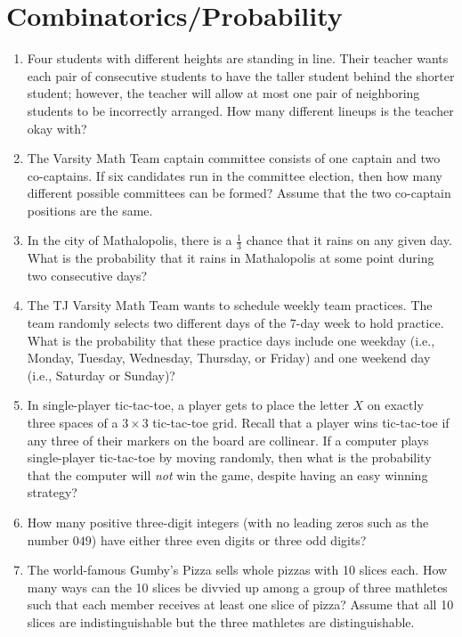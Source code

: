 \documentclass[11pt]{article}
\begin{document}
	\section{Combinatorics/Probability}
		\begin{enumerate}[1.]
			\item Four students with different heights are standing in line. Their teacher wants each pair of consecutive students to have the taller student behind the shorter student; however, the teacher will allow at most one pair of neighboring students to be incorrectly arranged. How many different lineups is the teacher okay with?
			
			\item The Varsity Math Team captain committee consists of one captain and two co-captains. If six candidates run in the committee election, then how many different possible committees can be formed? Assume that the two co-captain positions are the same.
			
			\item In the city of Mathalopolis, there is a $\frac{1}{3}$ chance that it rains on any given day. What is the probability that it rains in Mathalopolis at some point during two consecutive days?
			
			\item The TJ Varsity Math Team wants to schedule weekly team practices. The team randomly selects two different days of the 7-day week to hold practice. What is the probability that these practice days include one weekday (i.e., Monday, Tuesday, Wednesday, Thursday, or Friday) and one weekend day (i.e., Saturday or Sunday)?
			
			\item In single-player tic-tac-toe, a player gets to place the letter $X$ on exactly three spaces of a $3 \times 3$ tic-tac-toe grid. Recall that a player wins tic-tac-toe if any three of their markers on the board are collinear. If a computer plays single-player tic-tac-toe by moving randomly, then what is the probability that the computer will \textit{not} win the game, despite having an easy winning strategy?
			
			\item How many positive three-digit integers (with no leading zeros such as the number $049$) have either three even digits or three odd digits?
			
			\item The world-famous Gumby's Pizza sells whole pizzas with 10 slices each. How many ways can the 10 slices be divvied up among a group of three mathletes such that each member receives at least one slice of pizza? Assume that all 10 slices are indistinguishable but the three mathletes are distinguishable.
			

\end{enumerate}
\end{document}
